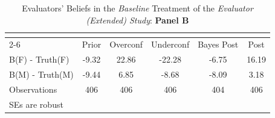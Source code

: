 \begin{table}[htbp]\centering
\caption{Evaluators' Beliefs in the \textit{Baseline} Treatment of the \textit{Evaluator (Extended) Study}: \textbf{Panel B}}
\begin{tabular}{l*{5}{c}}
\hline\hline
                &\multicolumn{5}{c}{}                             \\\cmidrule(lr){2-6}
                &\multicolumn{1}{c}{Prior}&\multicolumn{1}{c}{Overconf}&\multicolumn{1}{c}{Underconf}&\multicolumn{1}{c}{Bayes Post}&\multicolumn{1}{c}{Post}\\
\hline
B(F) - Truth(F) &    -9.32&    22.86&   -22.28&    -6.75&    16.19\\
B(M) - Truth(M) &    -9.44&     6.85&    -8.68&    -8.09&     3.18\\
\hline
Observations    &      406&      406&      406&      404&      406\\
\hline\hline
\multicolumn{6}{l}{\footnotesize SEs are robust}\\
\end{tabular}
\end{table}
